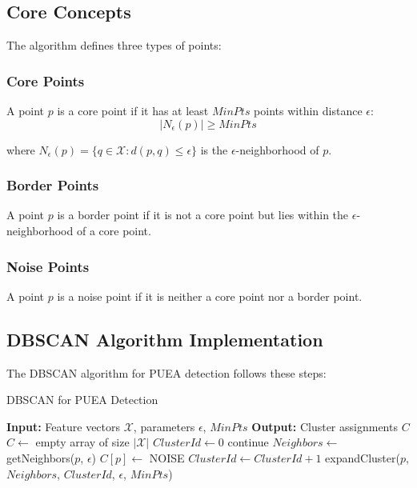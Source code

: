 \subsection{Core Concepts}
The algorithm defines three types of points:

\subsubsection{Core Points}
A point $p$ is a core point if it has at least $MinPts$ points within distance $\epsilon$:
\begin{equation}
|N_\epsilon(p)| \geq MinPts
\end{equation}

where $N_\epsilon(p) = \{q \in \mathcal{X} : d(p,q) \leq \epsilon\}$ is the $\epsilon$-neighborhood of $p$.

\subsubsection{Border Points}
A point $p$ is a border point if it is not a core point but lies within the $\epsilon$-neighborhood of a core point.

\subsubsection{Noise Points}
A point $p$ is a noise point if it is neither a core point nor a border point.

\subsection{DBSCAN Algorithm Implementation}
The DBSCAN algorithm for PUEA detection follows these steps:

\begin{algorithm}
\caption{DBSCAN for PUEA Detection}
\begin{algorithmic}[1]
\State \textbf{Input:} Feature vectors $\mathcal{X}$, parameters $\epsilon$, $MinPts$
\State \textbf{Output:} Cluster assignments $C$
\State $C \leftarrow$ empty array of size $|\mathcal{X}|$
\State $ClusterId \leftarrow 0$
        \State continue
    \EndIf
    \State $Neighbors \leftarrow$ getNeighbors($p$, $\epsilon$)
        \State $C[p] \leftarrow$ NOISE
    \Else
        \State $ClusterId \leftarrow ClusterId + 1$
        \State expandCluster($p$, $Neighbors$, $ClusterId$, $\epsilon$, $MinPts$)
    \EndIf
\EndFor
\end{algorithmic}
\end{algorithm}

